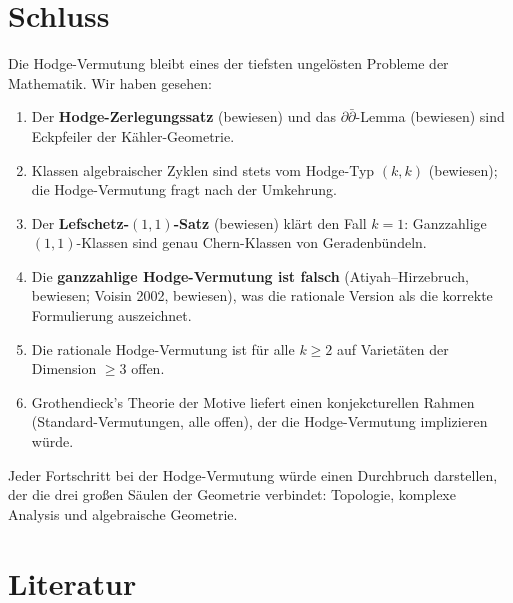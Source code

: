 \documentclass[12pt,a4paper]{amsart}
\theoremstyle{definition}
\theoremstyle{remark}
\begin{document}
\section*{Schluss}
\label{sec:schluss}

Die Hodge-Vermutung bleibt eines der tiefsten ungelösten Probleme der Mathematik.
Wir haben gesehen:

\begin{enumerate}[label=(\roman*)]
\item Der \textbf{Hodge-Zerlegungssatz} (bewiesen) und das $\partial\bar\partial$-Lemma
  (bewiesen) sind Eckpfeiler der Kähler-Geometrie.
\item Klassen algebraischer Zyklen sind stets vom Hodge-Typ $(k,k)$ (bewiesen);
  die Hodge-Vermutung fragt nach der Umkehrung.
\item Der \textbf{Lefschetz-$(1,1)$-Satz} (bewiesen) klärt den Fall $k=1$:
  Ganzzahlige $(1,1)$-Klassen sind genau Chern-Klassen von Geradenbündeln.
\item Die \textbf{ganzzahlige Hodge-Vermutung ist falsch} (Atiyah–Hirzebruch,
  bewiesen; Voisin 2002, bewiesen), was die rationale Version als die korrekte
  Formulierung auszeichnet.
\item Die rationale Hodge-Vermutung ist für alle $k \ge 2$ auf Varietäten der
  Dimension $\ge 3$ offen.
\item Grothendieck's Theorie der Motive liefert einen konjekcturellen Rahmen
  (Standard-Vermutungen, alle offen), der die Hodge-Vermutung implizieren würde.
\end{enumerate}

Jeder Fortschritt bei der Hodge-Vermutung würde einen Durchbruch darstellen, der
die drei großen Säulen der Geometrie verbindet: Topologie, komplexe Analysis und
algebraische Geometrie.

\section{Literatur}
\label{sec:literatur}
\end{document}
